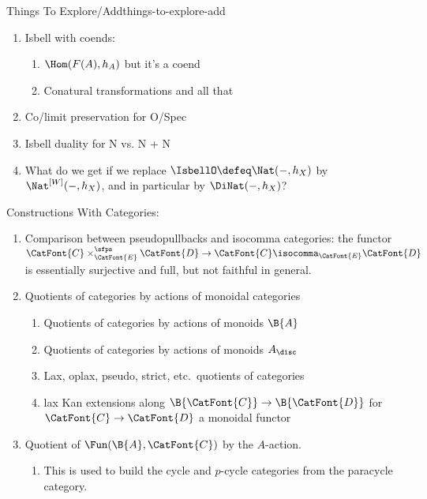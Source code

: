 \begin{remark}{Things To Explore/Add}{things-to-explore-add}
\begin{enumerate}
\begin{enumerate}
\[                        \to%
                        \Tr(\CatFont{C}).%
                    \]%
                    By the way, what is $\Tr(\SimplexCategory)$? What is $\Tr(\B{A})$? What about $\Nat(\id_{\CatFont{C}},\id_{\CatFont{C}})$ for $\CatFont{C}=\B{A}$ or $\CatFont{C}=\SimplexCategory$
            \end{enumerate}
        \item Isbell with coends:
            \begin{enumerate}
                \item $\Hom(F(A),h_A)$ but it's a coend
                \item Conatural transformations and all that
            \end{enumerate}
        \item Co/limit preservation for O/Spec
        \item Isbell duality for N vs. N + N
        \item What do we get if we replace $\IsbellO\defeq\Nat(-,h_{X})$ by $\Nat^{[W]}(-,h_{X})$, and in particular by $\DiNat(-,h_{X})$?
    \end{enumerate}
    Constructions With Categories:
    \begin{enumerate}
        \item Comparison between pseudopullbacks and isocomma categories: the  functor $\CatFont{C}\times^{\sfps}_{\CatFont{E}}\CatFont{D}\to\CatFont{C}\isocomma_{\CatFont{E}}\CatFont{D}$ is essentially surjective and full, but not faithful in general.
        \item Quotients of categories by actions of monoidal categories
            \begin{enumerate}
                \item Quotients of categories by actions of monoids $\B{A}$
                \item Quotients of categories by actions of monoids $A_{\disc}$
                \item Lax, oplax, pseudo, strict, etc.\ quotients of categories
                \item lax Kan extensions along $\B{\CatFont{C}}\to\B{\CatFont{D}}$ for $\CatFont{C}\to\CatFont{D}$ a monoidal functor
            \end{enumerate}
        \item Quotient of $\Fun(\B{A},\CatFont{C})$ by the $A$-action.
            \begin{enumerate}
                \item This is used to build the cycle and $p$-cycle categories from the paracycle category.

\end{enumerate}
\end{enumerate}
\end{remark}
